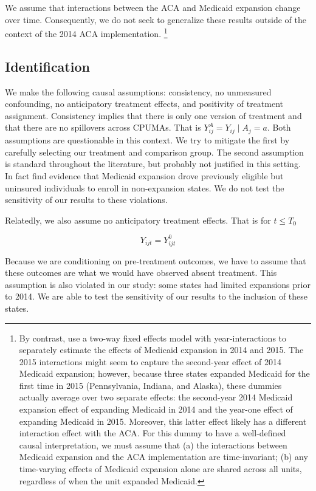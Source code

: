 \documentclass[final]{article}
\begin{document}
We assume that interactions between the ACA and Medicaid expansion change over time. Consequently, we do not seek to generalize these results outside of the context of the 2014 ACA implementation. \footnote{By contrast, \cite{frean2017premium} use a two-way fixed effects model with year-interactions to separately estimate the effects of Medicaid expansion in 2014 and 2015. The 2015 interactions might seem to capture the second-year effect of 2014 Medicaid expansion; however, because three states expanded Medicaid for the first time in 2015 (Pennsylvania, Indiana, and Alaska), these dummies actually average over two separate effects: the second-year 2014 Medicaid expansion effect of expanding Medicaid in 2014 and the year-one effect of expanding Medicaid in 2015. Moreover, this latter effect likely has a different interaction effect with the ACA. For this dummy to have a well-defined causal interpretation, we must assume that (a) the interactions between Medicaid expansion and the ACA implementation are time-invariant; (b) any time-varying effects of Medicaid expansion alone are shared across all units, regardless of when the unit expanded Medicaid.}

\subsection{Identification}

We make the following causal assumptions: consistency, no unmeasured confounding, no anticipatory treatment effects, and positivity of treatment assignment. Consistency implies that there is only one version of treatment and that there are no spillovers across CPUMAs. That is $Y_{ij}^A = Y_{ij} \mid A_j = a$. Both assumptions are questionable in this context. We try to mitigate the first by carefully selecting our treatment and comparison group. The second assumption is standard throughout the literature, but probably not justified in this setting. In fact \cite{frean2017premium} find evidence that Medicaid expansion drove previously eligible but uninsured individuals to enroll in non-expansion states. We do not test the sensitivity of our results to these violations.

Relatedly, we also assume no anticipatory treatment effects. That is for $t \le T_0$

$$
Y_{ijt} = Y_{ijt}^0
$$

Because we are conditioning on pre-treatment outcomes, we have to assume that these outcomes are what we would have observed absent treatment. This assumption is also violated in our study: some states had limited expansions prior to 2014. We are able to test the sensitivity of our results to the inclusion of these states.
\end{document}
